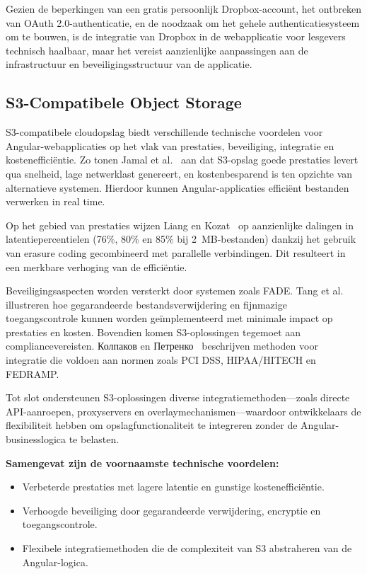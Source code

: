 Gezien de beperkingen van een gratis persoonlijk Dropbox-account, het ontbreken van OAuth 2.0-authenticatie, en de noodzaak om het gehele authenticatiesysteem 
om te bouwen, is de integratie van Dropbox in de webapplicatie voor lesgevers technisch haalbaar, maar het vereist aanzienlijke aanpassingen aan de infrastructuur 
en beveiligingsstructuur van de applicatie.

\subsection{S3-Compatibele Object Storage}

S3-compatibele cloudopslag biedt verschillende technische voordelen voor Angular-webapplicaties op het vlak van prestaties, beveiliging, integratie en kostenefficiëntie. Zo tonen Jamal et al.~\cite{Jamal2021Performance} aan dat S3-opslag goede prestaties levert qua snelheid, lage netwerklast genereert, en kostenbesparend is ten opzichte van alternatieve systemen. Hierdoor kunnen Angular-applicaties efficiënt bestanden verwerken in real time.

Op het gebied van prestaties wijzen Liang en Kozat~\cite{Liang2014FAST} op aanzienlijke dalingen in latentiepercentielen (76\%, 80\% en 85\% bij 2~MB-bestanden) dankzij het gebruik van erasure coding gecombineerd met parallelle verbindingen. Dit resulteert in een merkbare verhoging van de efficiëntie.

Beveiligingsaspecten worden versterkt door systemen zoals FADE. Tang et al.~\cite{Tang2010FADE, Tang2012Secure} illustreren hoe gegarandeerde bestandsverwijdering en fijnmazige toegangscontrole kunnen worden geïmplementeerd met minimale impact op prestaties en kosten. Bovendien komen S3-oplossingen tegemoet aan compliancevereisten. Колпаков en Петренко~\cite{kolpakov2018data} beschrijven methoden voor integratie die voldoen aan normen zoals PCI DSS, HIPAA/HITECH en FEDRAMP.

Tot slot ondersteunen S3-oplossingen diverse integratiemethoden—zoals directe API-aanroepen, proxyservers en overlaymechanismen—waardoor ontwikkelaars de flexibiliteit hebben om opslagfunctionaliteit te integreren zonder de Angular-businesslogica te belasten.

\textbf{Samengevat zijn de voornaamste technische voordelen:}
\begin{itemize}
    \item Verbeterde prestaties met lagere latentie en gunstige kostenefficiëntie.
    \item Verhoogde beveiliging door gegarandeerde verwijdering, encryptie en toegangscontrole.
    \item Flexibele integratiemethoden die de complexiteit van S3 abstraheren van de Angular-logica.
\end{itemize}

